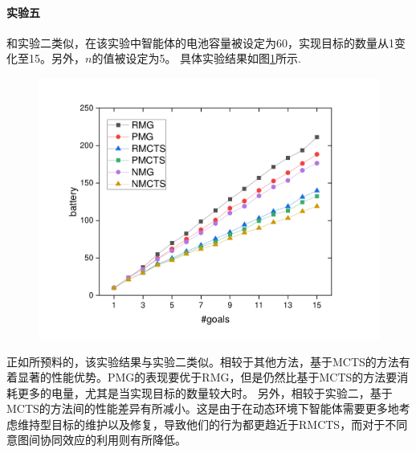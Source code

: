 \paragraph{实验五}
和实验二类似，在该实验中智能体的电池容量被设定为60，实现目标的数量从1变化至15。另外，$n$的值被设定为5。
具体实验结果如图\ref{fig:dynamic2}所示.
\begin{figure}[h!]
\centering
\includegraphics[scale=0.4]{./figs/gX_cY_fixCap60_d}
\captionsetup{justification=centering}
\label{fig:dynamic2}
\end{figure}

正如所预料的，该实验结果与实验二类似。相较于其他方法，基于MCTS的方法有着显著的性能优势。PMG的表现要优于RMG，但是仍然比基于MCTS的方法要消耗更多的电量，尤其是当实现目标的数量较大时。
%
另外，相较于实验二，基于MCTS的方法间的性能差异有所减小。这是由于在动态环境下智能体需要更多地考虑维持型目标的维护以及修复，导致他们的行为都更趋近于RMCTS，而对于不同意图间协同效应的利用则有所降低。

